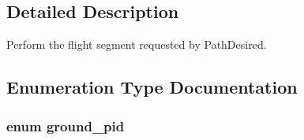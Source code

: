 \subsection{Detailed Description}
Perform the flight segment requested by Path\-Desired. 

\subsection{Enumeration Type Documentation}
\hypertarget{group___ground_path_follower_ga1223527343fc1b6614c7abf83ed7d170}{
\subsubsection[{ground\-\_\-pid}]{\setlength{\rightskip}{0pt plus 5cm}enum {\bf ground\-\_\-pid}}}\label{group___ground_path_follower_ga1223527343fc1b6614c7abf83ed7d170}
